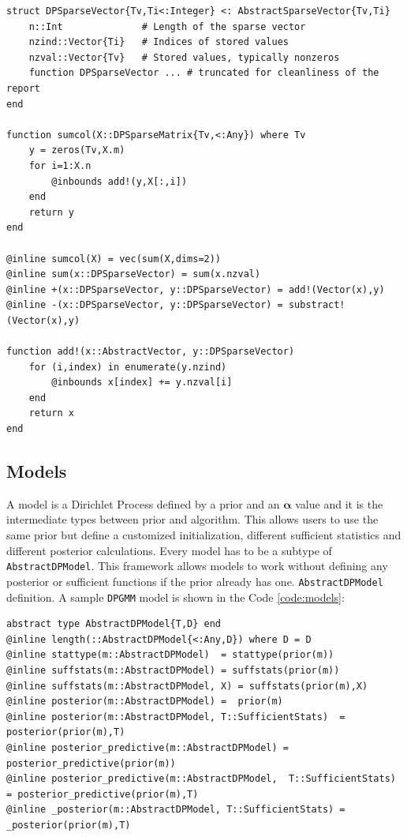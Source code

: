\documentclass[12pt, a4paper]{article}
\newenvironment{code}{\captionsetup{type=listing}}{}
\begin{document}
\begin{code}
\begin{verbatim}
struct DPSparseVector{Tv,Ti<:Integer} <: AbstractSparseVector{Tv,Ti}
    n::Int              # Length of the sparse vector
    nzind::Vector{Ti}   # Indices of stored values
    nzval::Vector{Tv}   # Stored values, typically nonzeros
    function DPSparseVector ... # truncated for cleanliness of the report
end

function sumcol(X::DPSparseMatrix{Tv,<:Any}) where Tv
    y = zeros(Tv,X.m)
    for i=1:X.n
        @inbounds add!(y,X[:,i])
    end
    return y
end

@inline sumcol(X) = vec(sum(X,dims=2))
@inline sum(x::DPSparseVector) = sum(x.nzval)
@inline +(x::DPSparseVector, y::DPSparseVector) = add!(Vector(x),y)
@inline -(x::DPSparseVector, y::DPSparseVector) = substract!(Vector(x),y)

function add!(x::AbstractVector, y::DPSparseVector)
    for (i,index) in enumerate(y.nzind)
        @inbounds x[index] += y.nzval[i]
    end
    return x
end
\end{verbatim}
\label{code:dpsparsevector}
\end{code}


\subsection{Models}
A model is a Dirichlet Process defined by a prior and an $\boldsymbol \alpha$ value and it is the intermediate types between prior and algorithm. This allows users to use the same prior but define a customized initialization, different sufficient statistics and different posterior calculations. Every model has to be a subtype of \texttt{AbstractDPModel}. This framework allows models to work without defining any posterior or sufficient functions if the prior already has one. \texttt{AbstractDPModel} definition. A sample \texttt{DPGMM} model is shown in the Code \ref{code:models}:

\begin{code}
\begin{verbatim}
abstract type AbstractDPModel{T,D} end
@inline length(::AbstractDPModel{<:Any,D}) where D = D
@inline stattype(m::AbstractDPModel)  = stattype(prior(m))
@inline suffstats(m::AbstractDPModel) = suffstats(prior(m))
@inline suffstats(m::AbstractDPModel, X) = suffstats(prior(m),X)
@inline posterior(m::AbstractDPModel) =  prior(m)
@inline posterior(m::AbstractDPModel, T::SufficientStats)  = posterior(prior(m),T)
@inline posterior_predictive(m::AbstractDPModel) = posterior_predictive(prior(m))
@inline posterior_predictive(m::AbstractDPModel,  T::SufficientStats) = posterior_predictive(prior(m),T)
@inline _posterior(m::AbstractDPModel, T::SufficientStats) = _posterior(prior(m),T)
\end{verbatim}
\label{code:models}
\end{code}
\end{document}
